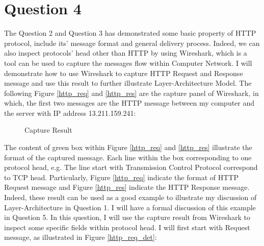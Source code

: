\documentclass[10pt,a4paper]{article}
\begin{document}
\section*{Question 4}
The Question 2 and Question 3 has demonstrated some basic property of HTTP protocol, include its' message format and general delivery process. Indeed, we can also inspect protocols' head other than HTTP by using Wireshark, which is a tool can be used to capture the messages flow within Computer Network. I will demonstrate how to use Wireshark to capture HTTP Request and Response message and use this result to further illustrate Layer-Architecture Model. The following Figure \ref{http_req} and \ref{http_res} are the capture panel of Wireshark, in which, the first two messages are the HTTP message between my computer and the server with IP address 13.211.159.241:
\begin{figure}[H]
	\begin{center}
	\hspace{1cm}
	\end{center}
	\caption{Capture Result}
	\label{capture}
\end{figure}
The content of green box within Figure \ref{http_req} and \ref{http_res} illustrate the format of the captured message. Each line within the box corresponding to one protocol head, e.g. The line start with Transmission Control Protocol correspond to TCP head. Particularly, Figure \ref{http_req} indicate the format of HTTP Request message and Figure \ref{http_res} indicate the HTTP Response message. Indeed, these result can be used as a good example to illustrate my discussion of Layer-Architecture in Question 1. I will have a formal discussion of this example in Question 5. In this question, I will use the capture result from Wireshark to inspect some specific fields within protocol head. I will first start with Request message, as illustrated in Figure \ref{http_req_det}:
\end{document}
